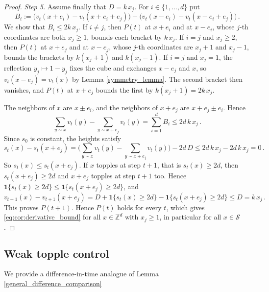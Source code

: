 \documentclass[12pt]{amsart}
\begin{document}
\begin{proof}
\emph{Step 5.} Assume finally that $D = k\,x_j$. For $i \in \{1, \ldots, d\}$ put
\begin{equation*}
B_i := \big(v_t(x+e_i) - v_t(x+e_i+e_j)\big) + \big(v_t(x-e_i) - v_t(x-e_i+e_j)\big)\,.
\end{equation*}
We show that $B_i \leq 2k\,x_j$. If $i \neq j$, then $P(t)$ at $x+e_i$ and at $x-e_i$, whose $j$-th coordinates are both $x_j \geq 1$, bounds each bracket by $k\,x_j$. If $i = j$ and $x_j \geq 2$, then $P(t)$ at $x+e_j$ and at $x-e_j$, whose $j$-th coordinates are $x_j+1$ and $x_j-1$, bounds the brackets by $k(x_j+1)$ and $k(x_j-1)$. If $i = j$ and $x_j = 1$, the reflection $y_j \mapsto 1-y_j$ fixes the cube and exchanges $x-e_j$ and $x$, so $v_t(x-e_j) = v_t(x)$ by Lemma \ref{symmetry_lemma}. The second bracket then vanishes, and $P(t)$ at $x+e_j$ bounds the first by $k(x_j+1) = 2k\,x_j$.

The neighbors of $x$ are $x \pm e_i$, and the neighbors of $x+e_j$ are $x+e_j \pm e_i$. Hence
\begin{equation*}
\sum_{y \sim x} v_t(y) - \sum_{y \sim x+e_j} v_t(y) = \sum_{i=1}^d B_i \leq 2d\,k\,x_j\,.
\end{equation*}
Since $s_0$ is constant, the heights satisfy
\begin{equation*}
s_t(x) - s_t(x+e_j) = \Big(\sum_{y \sim x} v_t(y) - \sum_{y \sim x+e_j} v_t(y)\Big) - 2d\,D \leq 2d\,k\,x_j - 2d\,k\,x_j = 0\,.
\end{equation*}
So $s_t(x) \leq s_t(x+e_j)$. If $x$ topples at step $t+1$, that is $s_t(x) \geq 2d$, then $s_t(x+e_j) \geq 2d$ and $x+e_j$ topples at step $t+1$ too. Hence $\mathbf{1}\{s_t(x) \geq 2d\} \leq \mathbf{1}\{s_t(x+e_j) \geq 2d\}$, and
\begin{equation*}
v_{t+1}(x) - v_{t+1}(x+e_j) = D + \mathbf{1}\{s_t(x) \geq 2d\} - \mathbf{1}\{s_t(x+e_j) \geq 2d\} \leq D = k\,x_j\,.
\end{equation*}
This proves $P(t+1)$. Hence $P(t)$ holds for every $t$, which gives \eqref{eq:cor:derivative_bound} for all $x \in \mathbb{Z}^d$ with $x_j \geq 1$, in particular for all $x \in \mathcal{S}$.
    \end{proof}
	
	
	\subsection{Weak topple control} \label{subsec:weak_topple}	
	We provide a difference-in-time analogue of Lemma \ref{general_difference_comparison}
\end{document}
